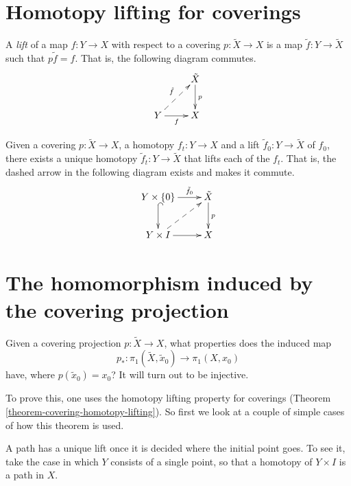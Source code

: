 \section{Homotopy lifting for coverings}
\label{section-covering-homotopy-lifting}

\begin{definition}
\label{definition-lift-covering}
A {\it lift} of a map $f:Y\to X$ with
respect to a covering $p:\tilde{X}\to X$ is
a map $\tilde{f}:Y\to\tilde{X}$ such that
$p\tilde{f}=f$. That is, the following
diagram commutes.
$$
\xymatrix{
  & \tilde{X} \ar[d]^{p} \\
Y \ar@{-->}[ur]^{\tilde{f}}
  \ar[r]_{f}
  & X
}
$$
\end{definition}

\begin{theorem}
\label{theorem-covering-homotopy-lifting}
Given a covering $p:\tilde{X}\to X$, a
homotopy $f_t:Y\to X$ and a lift
$\tilde{f}_0:Y\to\tilde{X}$ of $f_0$, there
exists a unique homotopy
$\tilde{f}_t:Y\to\tilde{X}$ that lifts each
of the $f_t$. That is, the dashed arrow in
the following diagram exists and makes it
commute.
$$
\xymatrix{
Y\times\{0\} \ar[r]^-{\tilde{f}_0}
  \ar@{^{(}->}[d]
  & \tilde{X} \ar[d]^{p} \\
Y\times I \ar[r] \ar@{-->}[ur]
  & X
}
$$
\end{theorem}

\section{The homomorphism induced by the
covering projection}
\label{section-covering-induced-homomorphism}

Given a covering projection
$p:\tilde{X}\to X$, what properties does the
induced map
$$
p_*:\pi_1(\tilde{X},\tilde{x}_0)
\to\pi_1(X,x_0)
$$
have, where $p(\tilde{x}_0)=x_0$? It will
turn out to be injective.

To prove this, one uses the homotopy lifting
property for coverings
(Theorem
\ref{theorem-covering-homotopy-lifting}). So
first we look at a couple of simple cases of
how this theorem is used.

\begin{proposition}
\label{proposition-path-lifting}
A path has a unique lift once it is decided
where the initial point goes. To see it, take
the case in which $Y$ consists of a single
point, so that a homotopy of $Y\times I$ is a
path in $X$.
\end{proposition}


